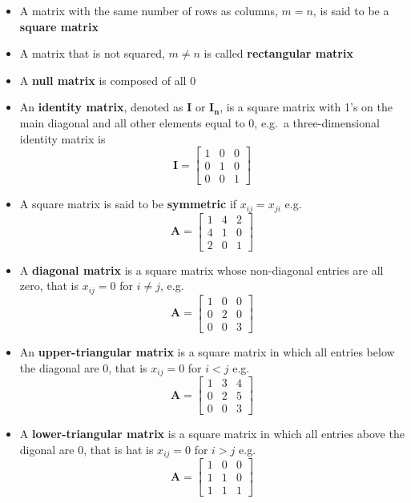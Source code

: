 \documentclass[
]{book}
\providecommand{\tightlist}{%
  \setlength{\itemsep}{0pt}\setlength{\parskip}{0pt}}
\theoremstyle{definition}
\theoremstyle{definition}
\theoremstyle{definition}
\theoremstyle{remark}
\begin{document}
\begin{itemize}
\tightlist
\item
  A matrix with the same number of rows as columns, \(m = n\), is said to be a \textbf{square matrix}
\item
  A matrix that is not squared, \(m \neq n\) is called \textbf{rectangular matrix}
\item
  A \textbf{null matrix} is composed of all 0
\item
  An \textbf{identity matrix}, denoted as \(\mathbf{I}\) or \(\mathbf{I_n}\), is a square matrix with 1's on the main diagonal and all other elements equal to 0, e.g.~a three-dimensional identity matrix is \[\mathbf{I}=\begin{bmatrix}
  1 & 0 & 0  \\
  0 & 1 & 0  \\
  0 & 0 & 1
  \end{bmatrix}\]
\item
  A square matrix is said to be \textbf{symmetric} if \(x_{ij} = x_{ji}\) e.g.~
  \[\mathbf{A}=\begin{bmatrix}
  1 & 4 & 2  \\
  4 & 1 & 0  \\
  2 & 0 & 1
  \end{bmatrix}\]
\item
  A \textbf{diagonal matrix} is a square matrix whose non-diagonal entries are all zero, that is \(x_{ij} = 0\) for \(i \neq j\), e.g.~
  \[\mathbf{A}=\begin{bmatrix}
  1 & 0 & 0  \\
  0 & 2 & 0  \\
  0 & 0 & 3
  \end{bmatrix}\]
\item
  An \textbf{upper-triangular matrix} is a square matrix in which all entries below the diagonal are 0, that is \(x_{ij}=0\) for \(i<j\) e.g.~
  \[\mathbf{A}=\begin{bmatrix}
  1 & 3 & 4  \\
  0 & 2 & 5  \\
  0 & 0 & 3
  \end{bmatrix}\]
\item
  A \textbf{lower-triangular matrix} is a square matrix in which all entries above the digonal are 0, that is hat is \(x_{ij}=0\) for \(i>j\) e.g.~
  \[\mathbf{A}=\begin{bmatrix}
  1 & 0 & 0  \\
  1 & 1 & 0  \\
  1 & 1 & 1
  \end{bmatrix}\]
\end{itemize}
\end{document}
